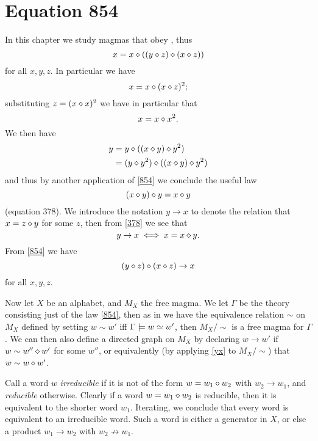 \chapter{Equation 854}\label{854-chapter}

In this chapter we study magmas that obey , thus
\begin{equation}\label{854}
  x = x \diamond ((y \diamond z) \diamond (x \diamond z))
\end{equation}
for all $x,y,z$.  In particular we have
$$ x = x \diamond (x \diamond z)^2;$$
substituting $z  = (x \diamond x)^2$ we have in particular that
\begin{equation}\label{8}
  x = x \diamond x^2.
\end{equation}
We then have
\begin{align*}
  y &= y \diamond ((x \diamond y) \diamond y^2) \\
  & = (y \diamond y^2) \diamond ((x \diamond y) \diamond y^2)
\end{align*}
and thus by another application of \eqref{854} we conclude the useful law
\begin{equation}\label{378}
   (x \diamond y) \diamond y = x \diamond y
\end{equation}
(equation 378).  We introduce the notation $y \to x$ to denote the relation that $x = z \diamond y$ for some $z$, then from \eqref{378} we see that
\begin{equation}\label{yx}
  y \to x \iff x = x \diamond y.
\end{equation}
From \eqref{854} we have
\begin{equation}\label{854-alt}
  (y \diamond z) \diamond (x \diamond z) \to x
\end{equation}
for all $x,y,z$.

Now let $X$ be an alphabet, and $M_X$ the free magma.  We let $\Gamma$ be the theory consisting just of the law \eqref{854}, then as in  we have the equivalence relation $\sim$ on $M_X$ defined by setting $w \sim w'$ iff $\Gamma \models w \simeq w'$, then $M_X/\sim$ is a free magma for $\Gamma$.  We can then also define a directed graph on $M_X$ by declaring $w \to w'$ if $w \sim w'' \diamond w'$ for some $w''$, or equivalently (by applying \eqref{yx} to $M_X/\sim$) that $w \sim w \diamond w'$.

Call a word $w$ \emph{irreducible} if it is not of the form $w = w_1 \diamond w_2$ with $w_2 \to w_1$, and \emph{reducible} otherwise.  Clearly if a word $w = w_1 \diamond w_2$ is reducible, then it is equivalent to the shorter word $w_1$.  Iterating, we conclude that every word is equivalent to an irreducible word.  Such a word is either a generator in $X$, or else a product $w_1 \to w_2$ with $w_2 \not \to w_1$.

